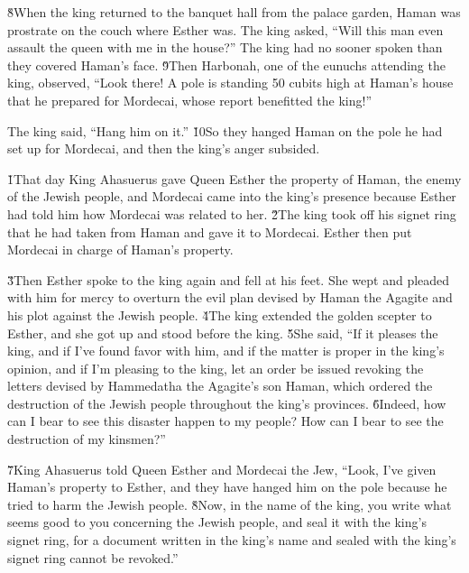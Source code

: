 \v{8}When the king returned to the banquet hall from the palace garden, Haman was prostrate on the couch where Esther was. The king asked, ``Will this man even assault the queen with me in the house?'' The king had no sooner spoken than they covered Haman's face. \v{9}Then Harbonah, one of the eunuchs attending the king, observed, ``Look there! A pole is standing 50 cubits high at Haman's house that he prepared for Mordecai, whose report benefitted the king!''

The king said, ``Hang him on it.'' \v{10}So they hanged Haman on the pole he had set up for Mordecai, and then the king's anger subsided.

\v{1}That day King Ahasuerus gave Queen Esther the property of Haman, the enemy of the Jewish people, and Mordecai came into the king's presence because Esther had told him how Mordecai was related to her. \v{2}The king took off his signet ring that he had taken from Haman and gave it to Mordecai. Esther then put Mordecai in charge of Haman's property.

\v{3}Then Esther spoke to the king again and fell at his feet. She wept and pleaded with him for mercy to overturn the evil plan devised by Haman the Agagite and his plot against the Jewish people. \v{4}The king extended the golden scepter to Esther, and she got up and stood before the king. \v{5}She said, ``If it pleases the king, and if I've found favor with him, and if the matter is proper in the king's opinion, and if I'm pleasing to the king, let an order be issued revoking the letters devised by Hammedatha the Agagite's son Haman, which ordered the destruction of the Jewish people throughout the king's provinces. \v{6}Indeed, how can I bear to see this disaster happen to my people? How can I bear to see the destruction of my kinsmen?''

\v{7}King Ahasuerus told Queen Esther and Mordecai the Jew, ``Look, I've given Haman's property to Esther, and they have hanged him on the pole because he tried to harm the Jewish people. \v{8}Now, in the name of the king, you write what seems good to you concerning the Jewish people, and seal it with the king's signet ring, for a document written in the king's name and sealed with the king's signet ring cannot be revoked.''

